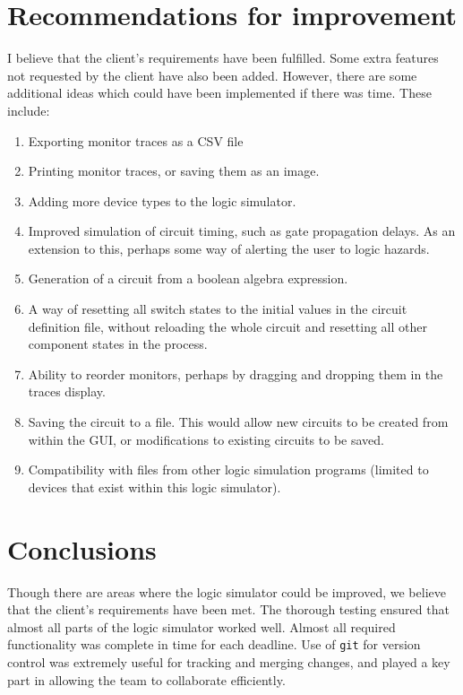 \documentclass[a4paper,10pt]{article}
\begin{document}
\section{Recommendations for improvement}
I believe that the client's requirements have been fulfilled. Some extra features not requested by the client have also been added. However, there are some additional ideas which could have been implemented if there was time. These include:

\begin{enumerate}
 \item Exporting monitor traces as a CSV file
 \item Printing monitor traces, or saving them as an image.
 \item Adding more device types to the logic simulator.
 \item Improved simulation of circuit timing, such as gate propagation delays. As an extension to this, perhaps some way of alerting the user to logic hazards. 
 \item Generation of a circuit from a boolean algebra expression.
 \item A way of resetting all switch states to the initial values in the circuit definition file, without reloading the whole circuit and resetting all other component states in the process.
 \item Ability to reorder monitors, perhaps by dragging and dropping them in the traces display.
 \item Saving the circuit to a file. This would allow new circuits to be created from within the GUI, or modifications to existing circuits to be saved.
 \item Compatibility with files from other logic simulation programs (limited to devices that exist within this logic simulator).
\end{enumerate}


\section{Conclusions}
Though there are areas where the logic simulator could be improved, we believe that the client's requirements have been met. The thorough testing ensured that almost all parts of the logic simulator worked well. Almost all required functionality was complete in time for each deadline. Use of \texttt{git} for version control was extremely useful for tracking and merging changes, and played a key part in allowing the team to collaborate efficiently. 
\end{document}
